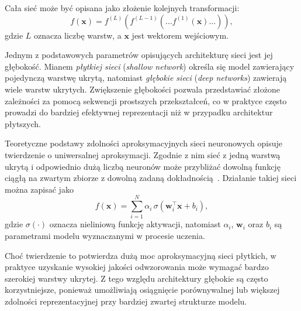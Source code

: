 Cała sieć może być opisana jako złożenie kolejnych transformacji:
\begin{equation}
	f(\mathbf{x}) = f^{(L)}\!\left(f^{(L-1)}\!\left(\ldots f^{(1)}(\mathbf{x}) \ldots \right)\right),
	\label{eq:composition}
\end{equation}
gdzie $L$ oznacza liczbę warstw, a $\mathbf{x}$ jest wektorem wejściowym.

Jednym z podstawowych parametrów opisujących architekturę sieci jest jej głębokość. Mianem \textit{płytkiej sieci} (\textit{shallow network}) określa się model zawierający pojedynczą warstwę ukrytą, natomiast \textit{głębokie sieci} (\textit{deep networks}) zawierają wiele warstw ukrytych. Zwiększenie głębokości pozwala przedstawiać złożone zależności za pomocą sekwencji prostszych przekształceń, co w praktyce często prowadzi do bardziej efektywnej reprezentacji niż w przypadku architektur płytszych.

Teoretyczne podstawy zdolności aproksymacyjnych sieci neuronowych opisuje twierdzenie o uniwersalnej aproksymacji. Zgodnie z nim sieć z jedną warstwą ukrytą i odpowiednio dużą liczbą neuronów może przybliżać dowolną funkcję ciągłą na zwartym zbiorze z dowolną zadaną dokładnością~\cite{Cybenko1989, HORNIK1989359}. Działanie takiej sieci można zapisać jako
\begin{equation}
	f(\mathbf{x}) = \sum_{i=1}^{N} \alpha_i \, \sigma\!\left(\mathbf{w}_i^{\top}\mathbf{x} + b_i\right),
	\label{eq:universal}
\end{equation}
gdzie $\sigma(\cdot)$ oznacza nieliniową funkcję aktywacji, natomiast $\alpha_i$, $\mathbf{w}_i$ oraz $b_i$ są parametrami modelu wyznaczanymi w procesie uczenia.

Choć twierdzenie to potwierdza dużą moc aproksymacyjną sieci płytkich, w praktyce uzyskanie wysokiej jakości odwzorowania może wymagać bardzo szerokiej warstwy ukrytej. Z tego względu architektury głębokie są często korzystniejsze, ponieważ umożliwiają osiągnięcie porównywalnej lub większej zdolności reprezentacyjnej przy bardziej zwartej strukturze modelu.

